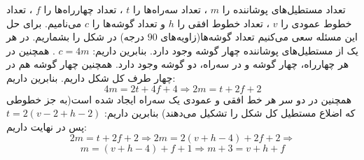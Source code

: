 \p
تعداد مستطیل‌های پوشاننده را
$m$
، تعداد سه‌راه‌ها را
$t$
، تعداد چهارراه‌ها را
$f$
، تعداد خطوط عمودی را
$v$
، تعداد خطوط افقی را
$h$
و تعداد گوشه‌ها را
$c$
می‌نامیم. برای حل این مسئله سعی می‌کنیم تعداد گوشه‌ها(زاویه‌های
$90$
درجه) در شکل را بشماریم. در هر یک از مستطیل‌های پوشاننده چهار گوشه وجود دارد. بنابرین داریم:
$c = 4m$
. همچنین در هر چهارراه، چهار گوشه و در سه‌راه، دو گوشه وجود دارد. همچنین چهار گوشه هم در چهار طرف کل شکل داریم. بنابرین داریم:
$$4m = 2t + 4f + 4 \Rightarrow 2m = t + 2f + 2$$
همچنین در دو سر هر خط افقی و عمودی یک سه‌راه ایجاد شده است(به جز خطوطی که اضلاع مستطیل کل شکل را تشکیل می‌دهند) بنابرین داریم:
$t = 2(v - 2 + h - 2)$
پس در نهایت داریم:
$$2m = t + 2f + 2 \Rightarrow 2m = 2(v + h - 4) + 2f + 2 \Rightarrow$$
$$m = (v + h - 4) + f + 1 \Rightarrow m + 3 = v + h + f$$